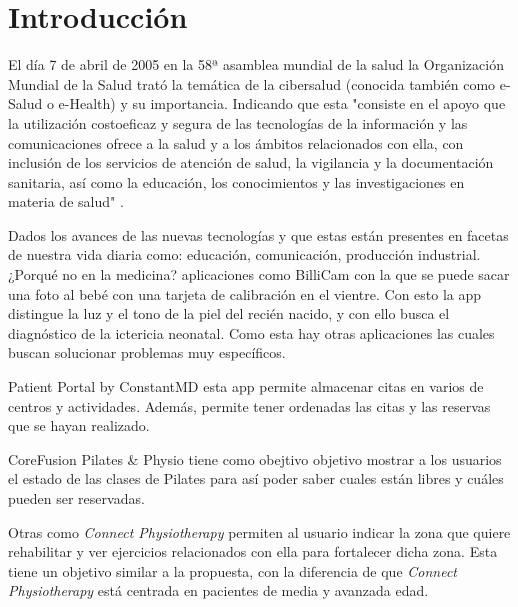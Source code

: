 \section{Introducción}
El día 7 de abril de 2005 en la 58ª asamblea mundial de la salud la Organización Mundial
de la Salud \cite{OMS} trató la temática de la cibersalud (conocida también como e-Salud
o e-Health) y su importancia. Indicando que esta "consiste en el apoyo que
la utilización costoeficaz y segura de las tecnologías de la información y las comunicaciones
ofrece a la salud y a los ámbitos relacionados con ella, con inclusión de los servicios de
atención de salud, la vigilancia y la documentación sanitaria, así como la educación, los
conocimientos y las investigaciones en materia de salud" \cite{58-asamblea}.

Dados los avances de las nuevas tecnologías y que estas están presentes en facetas de
nuestra vida diaria como: educación, comunicación, producción industrial. ¿Porqué no
en la medicina? aplicaciones como
BilliCam \cite{BilliCam} con la que se puede sacar una foto al bebé con una tarjeta de
calibración en el vientre. Con esto la app distingue la luz y el tono de la piel del recién
nacido, y con ello busca el diagnóstico de la ictericia neonatal. Como esta hay otras
aplicaciones las cuales buscan solucionar problemas muy específicos.

\medskip
Patient Portal by ConstantMD \cite{patient-portal} esta app permite  almacenar citas
en varios de centros y actividades. Además, permite tener ordenadas las citas y las
reservas que se hayan realizado.

\medskip
CoreFusion Pilates & Physio \cite{coreFusion} tiene como obejtivo objetivo mostrar a
los usuarios el estado de las clases de Pilates para así poder saber cuales están
libres y cuáles pueden ser reservadas.

\medskip
Otras como \textit{Connect Physiotherapy} \cite{Connect-Physiotherapy} permiten al usuario
indicar la zona que quiere rehabilitar y ver ejercicios relacionados con ella para fortalecer
dicha zona. Esta tiene un objetivo similar a la propuesta, con la diferencia de que
\textit{Connect Physiotherapy} está centrada en pacientes de media y avanzada edad.

